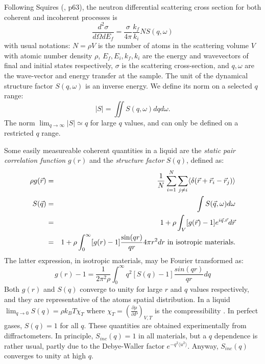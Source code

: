Following Squires (\cite{squires}, p63), the neutron differential scattering cross section for both coherent and incoherent processes is
\begin{equation}\label{eq:d2sigma}
\frac{d^2\sigma}{d\Omega dE_f} = \frac{\sigma}{4\pi}\frac{k_f}{k_i} N S(q, \omega)
\end{equation}
with usual notations: $N=\rho V$ is the number of atoms in the scattering volume $V$ with atomic number density $\rho$, $E_f, E_i, k_f, k_i$ are the energy and wavevectors of final and initial states respectively, $\sigma$ is the scattering cross-section, and $q,\omega$ are the wave-vector and energy transfer at the sample. The unit of the dynamical structure factor $S(q,\omega)$ is an inverse energy. We define its norm on a selected $q$ range:
\begin{equation}
|S| = \iint S(q,\omega) dq d\omega .
\end{equation}
The norm $\lim_{q \rightarrow \infty} |S| \simeq q$ for large $q$ values, and can only be defined on a restricted $q$ range.

Some easily measureable coherent quantities in a liquid are the \emph{static pair correlation function} $g(r)$ and the \emph{structure factor} $S(q)$, defined as:
\begin{eqnarray}
\rho g(\vec{r}) &=& \frac{1}{N} \sum_{i=1}^N \sum_{j \neq i} \langle \delta(\vec{r}+\vec{r}_i-\vec{r}_j) \rangle \\
S(\vec{q}) &=&\int S(\vec q,\omega) d\omega \label{eq:sq} \\
           &=&1 + \rho \int_V [g(\vec{r})-1] e^{i\vec{q}.\vec{r}} d\vec{r} \\
           &=&1 + \rho \int_{0}^{\infty} [g(r)-1] \frac{\sin(qr)}{qr} 4 \pi r^2 dr {\rm\ in\ isotropic\ materials.}
\end{eqnarray}
The latter expression, in isotropic materials, may be Fourier transformed as:
\begin{equation}
\label{eq:gr-sq}
g(r)-1 =\frac{1}{2\pi^2 \rho} \int_0^\infty q^2 [S(q) -1] \frac{sin(qr)}{qr} dq
\end{equation}
Both $g(r)$ and $S(q)$ converge to unity for large $r$ and $q$ values respectively, and they are representative of the atoms spatial distribution. In a liquid $\lim_{q \rightarrow 0} S(q) = \rho k_B T \chi_T$ where $\chi_T=(\frac{\partial \rho}{\partial P})_{V,T}$ is the compressibility \cite{Egelstaff67,fischer05}. In perfect gases, $S(q) = 1$ for all $q$. These quantities are obtained experimentally from diffractometers.
In principle, $S_{inc}(q) = 1$ in all materials, but a $q$ dependence is rather usual, partly due to the Debye-Waller factor $e^{-q^2 \langle u^2 \rangle}$. Anyway, $S_{inc}(q)$ converges to unity at high $q$.


